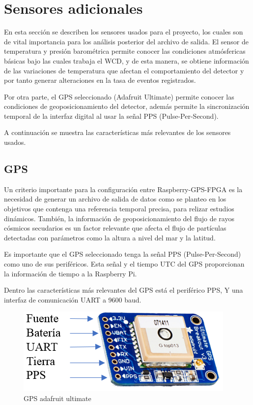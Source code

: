 \section{Sensores adicionales}
En esta sección se describen los sensores usados para el proyecto, los cuales son de vital importancia para los análisis posterior del archivo de salida. El sensor de temperatura y presión barométrica permite conocer las condiciones atmósfericas básicas bajo las cuales trabaja el WCD, y de esta manera, se obtiene información de las variaciones de temperatura que afectan el comportamiento del detector y por tanto generar alteraciones en la tasa de eventos registrados.

Por otra parte, el GPS seleccionado (Adafruit Ultimate) permite conocer las condiciones de geoposicionamiento del detector, además permite la sincronización temporal de la interfaz digital al usar la señal PPS (Pulse-Per-Second).

A continuación se muestra las características más relevantes de los sensores usados.

\subsection{GPS}
Un criterio importante para la configuración entre Raspberry-GPS-FPGA es la necesidad de generar un archivo de salida de datos como se planteo en los objetivos que contenga una referencia temporal precisa, para relizar estudios dinámicos.
También, la información de geoposicionamiento del flujo de rayos cósmicos secudarios es un factor relevante que afecta el flujo de partículas detectadas con parámetros como la altura a nivel del mar y la latitud.

Es importante que el GPS seleccionado tenga la señal PPS (Pulse-Per-Second) como uno de sus periféricos. 
Esta señal y el tiempo UTC del GPS proporcionan la información de tiempo a la Raspberry Pi.

Dentro las características más relevantes del GPS está el periférico PPS, Y una interfaz de comunicación UART a 9600 baud.


\begin{figure}[H]
\includegraphics[scale=0.85]{Figs/gps.png} 
\centering
\caption{GPS adafruit ultimate~\citep{Adafruit2020}}
\label{adecuacion}
\end{figure}

